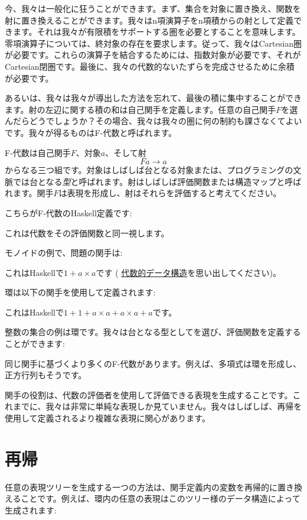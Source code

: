 今、我々は一般化に狂うことができます。まず、集合を対象に置き換え、関数を射に置き換えることができます。我々はn項演算子をn項積からの射として定義できます。それは我々が有限積をサポートする圏を必要とすることを意味します。零項演算子については、終対象の存在を要求します。従って、我々はCartesian圏が必要です。これらの演算子を結合するためには、指数対象が必要です、それがCartesian閉圏です。最後に、我々の代数的ないたずらを完成させるために余積が必要です。

あるいは、我々は我々が導出した方法を忘れて、最後の積に集中することができます。射の左辺に関する積の和は自己関手を定義します。任意の自己関手$F$を選んだらどうでしょうか？その場合、我々は我々の圏に何の制約も課さなくてよいです。我々が得るものはF-代数と呼ばれます。

F-代数は自己関手$F$、対象$a$、そして射
\[F a \to a\]
からなる三つ組です。対象はしばしば台となる対象または、プログラミングの文脈では台となる\emph{型}と呼ばれます。射はしばしば評価関数または構造マップと呼ばれます。関手$F$は表現を形成し、射はそれらを評価すると考えてください。

こちらがF-代数のHaskell定義です: 

これは代数をその評価関数と同一視します。

モノイドの例で、問題の関手は: 

これはHaskellで$1 + a\times{}a$です (
\hyperref[simple-algebraic-data-types]{代数的データ構造}を思い出してください)。

環は以下の関手を使用して定義されます: 

これはHaskellで$1 + 1 + a\times{}a + a\times{}a + a$です。

整数の集合の例は環です。我々は台となる型としてを選び、評価関数を定義することができます: 

同じ関手に基づくより多くのF-代数があります。例えば、多項式は環を形成し、正方行列もそうです。

関手の役割は、代数の評価者を使用して評価できる表現を生成することです。これまでに、我々は非常に単純な表現しか見ていません。我々はしばしば、再帰を使用して定義されるより複雑な表現に関心があります。

\section{再帰}

任意の表現ツリーを生成する一つの方法は、関手定義内の変数を再帰的に置き換えることです。例えば、環内の任意の表現はこのツリー様のデータ構造によって生成されます: 

